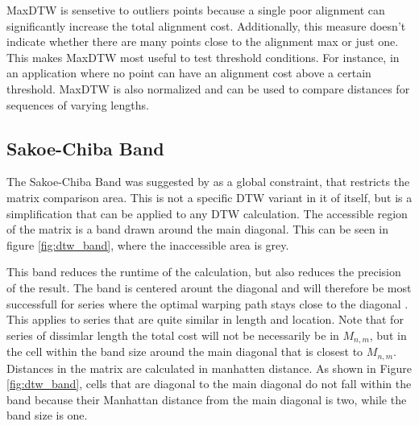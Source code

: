 MaxDTW is sensetive to outliers points because a single poor alignment can significantly increase the total alignment cost. Additionally, this measure doesn't indicate whether there are many points close to the alignment max or just one. This makes MaxDTW most useful to test threshold conditions. For instance, in an application where no point can have an alignment cost above a certain threshold. MaxDTW is also normalized and can be used to compare distances for sequences of varying lengths.

\subsection{Sakoe-Chiba Band}
\label{sec:sakoe}
The Sakoe-Chiba Band was suggested by \textcite{sakoe1978dynamic} as a global constraint, that restricts the matrix comparison area. This is not a specific DTW variant in it of itself, but is a simplification that can be applied to any DTW calculation. The accessible region of the matrix is a band drawn around the main diagonal. This can be seen in figure \ref{fig:dtw_band}, where the inaccessible area is grey.

This band reduces the runtime of the calculation, but also reduces the precision of the result. The band is centered arount the diagonal and will therefore be most successfull for series where the optimal warping path stays close to the diagonal \cite{sakoe1978dynamic}. This applies to series that are quite similar in length and location. Note that for series of dissimlar length the total cost will not be necessarily be in $M_{n,m}$, but in the cell within the band size around the main diagonal that is closest to $M_{n,m}$. Distances in the matrix are calculated in manhatten distance. As shown in Figure \ref{fig:dtw_band}, cells that are diagonal to the main diagonal do not fall within the band because their Manhattan distance from the main diagonal is two, while the band size is one.

